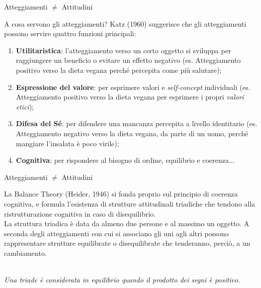 \documentclass{beamer}
\begin{document}
\begin{frame}{Atteggiamenti $\neq$ Attitudini}
    \begin{block}{A cosa servono gli atteggiamenti?}
        Katz (1960) suggerisce che gli atteggiamenti possono servire quattro funzioni principali: \\
        \small
    \begin{enumerate}
        \item \textbf{Utilitaristica}: l'atteggiamento verso un certo oggetto si sviluppa per raggiungere un beneficio o evitare un effetto negativo (es. Atteggiamento positivo verso la dieta vegana perché percepita come più salutare);
        \item \textbf{Espressione del valore}: per esprimere valori e \textit{self-concept} individuali (es. Atteggiamento positivo verso la dieta vegana per esprimere i propri \textit{valori etici});
        \item \textbf{Difesa del Sé}: per difendere una mancanza percepita a livello identitario (es. Atteggiamento negativo verso la dieta vegana, da parte di un uomo, perché mangiare l'insalata è poco virile); 
        \item \textbf{Cognitiva}: per rispondere al bisogno di ordine, equilibrio e coerenza...
    \end{enumerate}
    \end{block}
\end{frame}

\begin{frame}{Atteggiamenti $\neq$ Attitudini}
    \footnotesize
    \begin{block}{La Balance Theory (Heider, 1946)}
        si fonda proprio sul principio di coerenza cognitiva, e formula l'esistenza di strutture attitudinali triadiche che tendono alla ristrutturazione cognitiva in caso di disequilibrio. \\
        La struttura triadica è data da almeno due persone e al massimo un oggetto. A seconda degli atteggiamenti con cui si associano gli uni agli altri possono rappresentare strutture equilibrate o disequilibrate che tenderanno, perciò, a un cambiamento. \\
        \vspace{0.5em}
        \centering
        \\
        \vspace{0.5em}
        \textit{\scriptsize Una triade è considerata in equilibrio quando il prodotto dei segni è positivo.} \\
    \end{block}
\end{frame}
\end{document}
